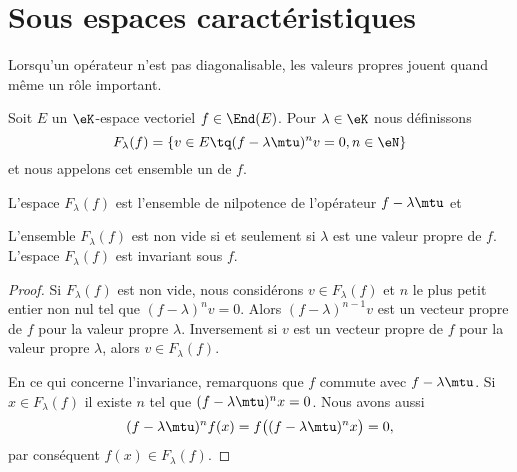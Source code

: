 \section{Sous espaces caractéristiques}


Lorsqu'un opérateur n'est pas diagonalisable, les valeurs propres jouent quand même un rôle important.

\begin{definition}  \label{DefFBNIooCGbIix}
    Soit \( E\) un \( \eK\)-espace vectoriel  \( f\in\End(E)\). Pour \( \lambda\in \eK\) nous définissons
    \begin{equation}
        F_{\lambda}(f)=\{ v\in E\tq (f-\lambda\mtu)^nv=0, n\in\eN \}
    \end{equation}
    et nous appelons cet ensemble un  de \( f\).
\end{definition}
L'espace \( F_{\lambda}(f)\) est l'ensemble de nilpotence de l'opérateur \( f-\lambda\mtu\) et

\begin{lemma}   \label{LemBLPooHMAoyJ}
    L'ensemble \( F_{\lambda}(f)\) est non vide si et seulement si \( \lambda\) est une valeur propre de \( f\). L'espace \( F_{\lambda}(f)\) est invariant sous \( f\).
\end{lemma}

\begin{proof}
    Si \( F_{\lambda}(f)\) est non vide, nous considérons \( v\in F_{\lambda}(f)\) et \( n\) le plus petit entier non nul tel que \( (f-\lambda)^nv=0\). Alors \( (f-\lambda)^{n-1}v\) est un vecteur propre de \( f\) pour la valeur propre \( \lambda\). Inversement si \( v\) est un vecteur propre de \( f\) pour la valeur propre \( \lambda\), alors \( v\in F_{\lambda}(f)\).

    En ce qui concerne l'invariance, remarquons que \( f\) commute avec \( f-\lambda\mtu\). Si \( x\in F_{\lambda}(f)\) il existe \( n\) tel que \( (f-\lambda\mtu)^nx=0\). Nous avons aussi
    \begin{equation}
        (f-\lambda\mtu)^nf(x)=f\big( (f-\lambda\mtu)^nx \big)=0,
    \end{equation}
    par conséquent \( f(x)\in F_{\lambda}(f)\).
\end{proof}

